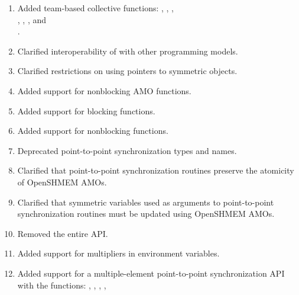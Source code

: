 \begin{enumerate}
%
%
\item Added team-based collective functions: ,
  , , \\
  , , , and \\
  .
%
%
\item Clarified interoperability of \openshmem with other programming models.
%
%
\item Clarified restrictions on using pointers to symmetric objects.
%
%
\item Added support for nonblocking \ac{AMO} functions.
%
%
\item Added support for blocking  functions.
%
%
\item Added support for nonblocking  functions.
%
%
\item Deprecated point-to-point synchronization types and names.
%
%
\item Clarified that point-to-point synchronization routines preserve the
  atomicity of OpenSHMEM \acp{AMO}.
%
%
\item Clarified that symmetric variables used as  arguments to
  point-to-point synchronization routines must be updated using OpenSHMEM
  \acp{AMO}.
%
%
\item Removed the entire \openshmem \Fortran \ac{API}.
%
%
\item Added support for multipliers in 
environment variables.
%
%
\item Added support for a multiple-element point-to-point synchronization \ac{API} with
  the functions: , ,
  , ,

\end{enumerate}
